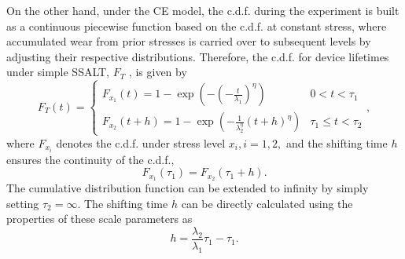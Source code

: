 \documentclass{article}
\begin{document}
On the other hand, under the CE model, the c.d.f. during the experiment is built as a continuous piecewise function based on the c.d.f. at constant stress, where accumulated wear from prior stresses is carried over to subsequent levels by adjusting their respective distributions. Therefore, the c.d.f. for device lifetimes under simple SSALT, $F_T$ , is given by
\begin{equation}
	F_T(t) = \begin{cases}
		F_{x_1}(t)  = 1-\exp\left(-\left(-\frac{t}{\lambda_1}\right)^{\eta}\right)  & 0 < t < \tau_1\\ \nonumber
		F_{x_2}(t+h) = 1-\exp\left(-\frac{1}{\lambda_2^\eta} \left(t+h\right)^{\eta}\right) & \tau_1 \leq t < \tau_2  \nonumber
	\end{cases},
\end{equation}
where $F_{x_i}$ denotes the c.d.f. under stress level $x_i, i =1,2,$ and the shifting time $h$ ensures the continuity of the c.d.f.,
\begin{equation}
F_{x_1}(\tau_1) = F_{x_2}(\tau_1 + h).  \nonumber
\end{equation}
The cumulative distribution function can be extended to infinity by simply setting $\tau_2=\infty.$
The shifting time $h$ can be directly calculated using the properties of these scale parameters as
\begin{equation}
h = \frac{\lambda_2}{\lambda_1} \tau_1 - \tau_1.   \nonumber
\end{equation}

\end{document}
